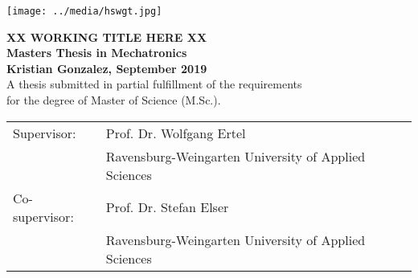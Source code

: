 \pagestyle{empty}
\begin{flushright}
\texttt{[image: ../media/hswgt.jpg]}
\end{flushright}

\begin{center}
\vspace*{5cm}

\huge
\textbf{XX WORKING TITLE HERE XX}\\
\Large
\vspace*{2cm}
\noindent \textbf{Masters Thesis in Mechatronics}\\
\vspace*{0.5cm}
\noindent \textbf{Kristian Gonzalez, September 2019}\\
\vspace*{2cm}
\normalsize
A thesis submitted in partial fulfillment of the requirements\\ for the degree
of Master of Science (M.Sc.).

\end{center}

\vspace*{4.5cm}
\begin{tabular}{ll}
Supervisor: & Prof. Dr. Wolfgang Ertel \\
 & Ravensburg-Weingarten University of Applied Sciences\\
Co-supervisor: & Prof. Dr. Stefan Elser\\
 & Ravensburg-Weingarten University of Applied Sciences\\
\end{tabular}
